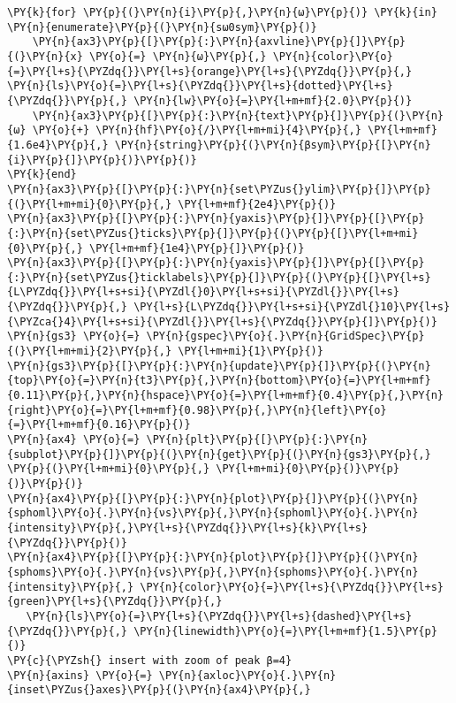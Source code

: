 \begin{Verbatim}[commandchars=\\\{\}]
\PY{k}{for} \PY{p}{(}\PY{n}{i}\PY{p}{,}\PY{n}{ω}\PY{p}{)} \PY{k}{in} \PY{n}{enumerate}\PY{p}{(}\PY{n}{sω0sym}\PY{p}{)}
    \PY{n}{ax3}\PY{p}{[}\PY{p}{:}\PY{n}{axvline}\PY{p}{]}\PY{p}{(}\PY{n}{x} \PY{o}{=} \PY{n}{ω}\PY{p}{,} \PY{n}{color}\PY{o}{=}\PY{l+s}{\PYZdq{}}\PY{l+s}{orange}\PY{l+s}{\PYZdq{}}\PY{p}{,} \PY{n}{ls}\PY{o}{=}\PY{l+s}{\PYZdq{}}\PY{l+s}{dotted}\PY{l+s}{\PYZdq{}}\PY{p}{,} \PY{n}{lw}\PY{o}{=}\PY{l+m+mf}{2.0}\PY{p}{)}
    \PY{n}{ax3}\PY{p}{[}\PY{p}{:}\PY{n}{text}\PY{p}{]}\PY{p}{(}\PY{n}{ω} \PY{o}{+} \PY{n}{hf}\PY{o}{/}\PY{l+m+mi}{4}\PY{p}{,} \PY{l+m+mf}{1.6e4}\PY{p}{,} \PY{n}{string}\PY{p}{(}\PY{n}{βsym}\PY{p}{[}\PY{n}{i}\PY{p}{]}\PY{p}{)}\PY{p}{)}
\PY{k}{end}
\PY{n}{ax3}\PY{p}{[}\PY{p}{:}\PY{n}{set\PYZus{}ylim}\PY{p}{]}\PY{p}{(}\PY{l+m+mi}{0}\PY{p}{,} \PY{l+m+mf}{2e4}\PY{p}{)}
\PY{n}{ax3}\PY{p}{[}\PY{p}{:}\PY{n}{yaxis}\PY{p}{]}\PY{p}{[}\PY{p}{:}\PY{n}{set\PYZus{}ticks}\PY{p}{]}\PY{p}{(}\PY{p}{[}\PY{l+m+mi}{0}\PY{p}{,} \PY{l+m+mf}{1e4}\PY{p}{]}\PY{p}{)}
\PY{n}{ax3}\PY{p}{[}\PY{p}{:}\PY{n}{yaxis}\PY{p}{]}\PY{p}{[}\PY{p}{:}\PY{n}{set\PYZus{}ticklabels}\PY{p}{]}\PY{p}{(}\PY{p}{[}\PY{l+s}{L\PYZdq{}}\PY{l+s+si}{\PYZdl{}0}\PY{l+s+si}{\PYZdl{}}\PY{l+s}{\PYZdq{}}\PY{p}{,} \PY{l+s}{L\PYZdq{}}\PY{l+s+si}{\PYZdl{}10}\PY{l+s}{\PYZca{}4}\PY{l+s+si}{\PYZdl{}}\PY{l+s}{\PYZdq{}}\PY{p}{]}\PY{p}{)}
\PY{n}{gs3} \PY{o}{=} \PY{n}{gspec}\PY{o}{.}\PY{n}{GridSpec}\PY{p}{(}\PY{l+m+mi}{2}\PY{p}{,} \PY{l+m+mi}{1}\PY{p}{)}
\PY{n}{gs3}\PY{p}{[}\PY{p}{:}\PY{n}{update}\PY{p}{]}\PY{p}{(}\PY{n}{top}\PY{o}{=}\PY{n}{t3}\PY{p}{,}\PY{n}{bottom}\PY{o}{=}\PY{l+m+mf}{0.11}\PY{p}{,}\PY{n}{hspace}\PY{o}{=}\PY{l+m+mf}{0.4}\PY{p}{,}\PY{n}{right}\PY{o}{=}\PY{l+m+mf}{0.98}\PY{p}{,}\PY{n}{left}\PY{o}{=}\PY{l+m+mf}{0.16}\PY{p}{)}
\PY{n}{ax4} \PY{o}{=} \PY{n}{plt}\PY{p}{[}\PY{p}{:}\PY{n}{subplot}\PY{p}{]}\PY{p}{(}\PY{n}{get}\PY{p}{(}\PY{n}{gs3}\PY{p}{,} \PY{p}{(}\PY{l+m+mi}{0}\PY{p}{,} \PY{l+m+mi}{0}\PY{p}{)}\PY{p}{)}\PY{p}{)}
\PY{n}{ax4}\PY{p}{[}\PY{p}{:}\PY{n}{plot}\PY{p}{]}\PY{p}{(}\PY{n}{sphoml}\PY{o}{.}\PY{n}{νs}\PY{p}{,}\PY{n}{sphoml}\PY{o}{.}\PY{n}{intensity}\PY{p}{,}\PY{l+s}{\PYZdq{}}\PY{l+s}{k}\PY{l+s}{\PYZdq{}}\PY{p}{)}
\PY{n}{ax4}\PY{p}{[}\PY{p}{:}\PY{n}{plot}\PY{p}{]}\PY{p}{(}\PY{n}{sphoms}\PY{o}{.}\PY{n}{νs}\PY{p}{,}\PY{n}{sphoms}\PY{o}{.}\PY{n}{intensity}\PY{p}{,} \PY{n}{color}\PY{o}{=}\PY{l+s}{\PYZdq{}}\PY{l+s}{green}\PY{l+s}{\PYZdq{}}\PY{p}{,}
   \PY{n}{ls}\PY{o}{=}\PY{l+s}{\PYZdq{}}\PY{l+s}{dashed}\PY{l+s}{\PYZdq{}}\PY{p}{,} \PY{n}{linewidth}\PY{o}{=}\PY{l+m+mf}{1.5}\PY{p}{)}
\PY{c}{\PYZsh{} insert with zoom of peak β=4}
\PY{n}{axins} \PY{o}{=} \PY{n}{axloc}\PY{o}{.}\PY{n}{inset\PYZus{}axes}\PY{p}{(}\PY{n}{ax4}\PY{p}{,}

\end{Verbatim}
